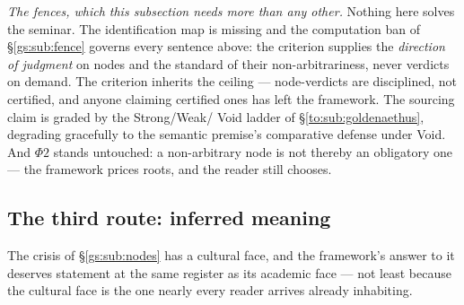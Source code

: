 \documentclass[11pt]{article}
\numberwithin{equation}{section}
\theoremstyle{plain}
\theoremstyle{definition}
\theoremstyle{remark}
\begin{document}
\emph{The fences, which this subsection needs more than any other.}
Nothing here solves the seminar. The identification map is missing and
the computation ban of \S\ref{gs:sub:fence} governs every sentence
above: the criterion supplies the \emph{direction of judgment} on
nodes and the standard of their non-arbitrariness, never verdicts on
demand. The criterion inherits the ceiling --- node-verdicts are
disciplined, not certified, and anyone claiming certified ones has
left the framework. The sourcing claim is graded by the Strong/Weak/
Void ladder of \S\ref{to:sub:goldenaethus}, degrading gracefully to
the semantic premise's comparative defense under Void. And $\Phi2$
stands untouched: a non-arbitrary node is not thereby an obligatory
one --- the framework prices roots, and the reader still chooses.

\subsection{The third route: inferred meaning}\label{gs:sub:thirdroute}

The crisis of \S\ref{gs:sub:nodes} has a cultural face, and the
framework's answer to it deserves statement at the same register as
its academic face --- not least because the cultural face is the one
nearly every reader arrives already inhabiting.
\end{document}

